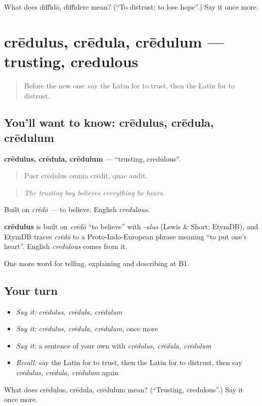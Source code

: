 \begin{tcolorbox}[breakable,colback=teal!4,colframe=teal!35!black,title={Before you move on}]
What does diffīdō, diffīdere mean? (\textquotedblleft{}To distrust; to lose hope\textquotedblright{}.) Say it once more.
\end{tcolorbox}
\section[crēdulus, crēdula, crēdulum]{crēdulus, crēdula, crēdulum — trusting, credulous}

\label{lesson:LA-C498-credulus}



\begin{quote}
Before the new one: say the Latin for to trust, then the Latin for to distrust.
\end{quote}

\subsection*{You'll want to know: crēdulus, crēdula, crēdulum}
\textbf{crēdulus, crēdula, crēdulum} — \textquotedblleft{}trusting, credulous\textquotedblright{}.

\begin{quote}
Puer crēdulus omnia crēdit, quae audit.
\end{quote}

\begin{quote}
\emph{The trusting boy believes everything he hears.}
\end{quote}

Built on \emph{crēdō} — to believe. English \emph{credulous}.

\begin{cousinweb}
\textbf{crēdulus} is built on \emph{crēdō} \textquotedblleft{}to believe\textquotedblright{} with \emph{-ulus} (Lewis \& Short; EtymDB), and EtymDB traces \emph{crēdō} to a Proto-Indo-European phrase meaning \textquotedblleft{}to put one’s heart\textquotedblright{}. English \emph{credulous} comes from it.
\end{cousinweb}

\begin{grammarlens}[title={What you've built}]
One more word for telling, explaining and describing at B1.
\end{grammarlens}

\subsection*{Your turn}
\begin{itemize}
\raggedright
  \item \emph{Say it:} \emph{crēdulus, crēdula, crēdulum}
  \item \emph{Say it:} \emph{crēdulus, crēdula, crēdulum}, once more
  \item \emph{Say it:} a sentence of your own with \emph{crēdulus, crēdula, crēdulum}
  \item \emph{Recall:} say the Latin for to trust, then the Latin for to distrust, then say \emph{crēdulus, crēdula, crēdulum} again
\end{itemize}

\begin{tcolorbox}[breakable,colback=teal!4,colframe=teal!35!black,title={Before you move on}]
What does crēdulus, crēdula, crēdulum mean? (\textquotedblleft{}Trusting, credulous\textquotedblright{}.) Say it once more.
\end{tcolorbox}
